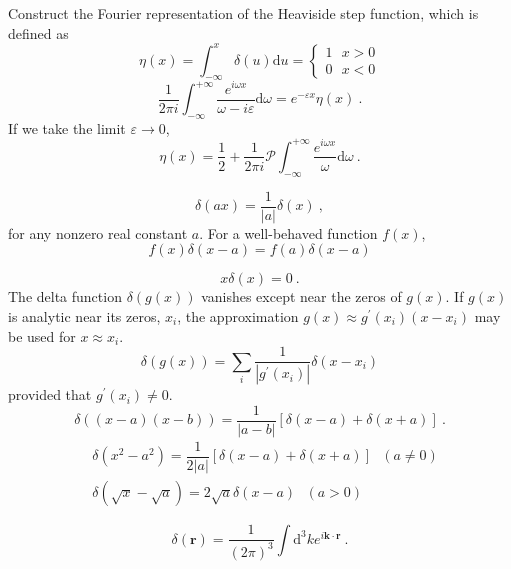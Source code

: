 \documentclass[12pt,a4paper]{article}
\renewcommand{\vec}[1]{\boldsymbol{#1}}
\newcommand{\dif}{\mathrm{d}}
\begin{document}
Construct the Fourier representation of the Heaviside step function, which is defined as
\begin{equation}
\eta(x) = \int_{-\infty}^x \delta(u) \dif u = 
\begin{cases}
1 ~~~ x > 0 \\
0 ~~~ x < 0
\end{cases}
\end{equation}
\begin{equation}
\dfrac{1}{2\pi i} \int_{-\infty}^{+\infty} \dfrac{e^{i\omega x}}{\omega -i \varepsilon} \dif \omega = e^{-\varepsilon x} \eta(x) ~.
\end{equation}
If we take the limit $\varepsilon \rightarrow 0$,
\begin{equation}
\eta(x) = \dfrac{1}{2} + \dfrac{1}{2\pi i} \mathcal P \int_{-\infty}^{+\infty} \dfrac{e^{i\omega x}}{\omega} \dif \omega ~. 
\end{equation}

\begin{equation}
\delta(ax) = \dfrac{1}{|a|} \delta(x) ~,
\end{equation}
for any nonzero real constant $a$. For a well-behaved function $f(x)$,
\begin{equation}
f(x) \delta(x-a) = f(a) \delta(x-a)
\end{equation}

\begin{equation}
x \delta(x) = 0 ~.
\end{equation}
The delta function $\delta(g(x))$ vanishes except near the zeros of $g(x)$. If $g(x)$ is analytic near its zeros, $x_i$, the approximation $g(x) \approx  g^\prime(x_i)(x - x_i)$ may be used for $x \approx x_i$. 
\begin{equation}
\delta(g(x)) = \sum_i \dfrac{1}{|g^\prime(x_i)|} \delta(x-x_i)
\end{equation}
provided that $g^\prime(x_i) \neq 0$.
\begin{equation}
\delta((x-a)(x-b)) = \dfrac{1}{|a-b|} [\delta(x-a) + \delta(x+a)] ~.
\end{equation}
\begin{align}
& \delta(x^2 -a^2) = \dfrac{1}{2|a|} [\delta(x-a) + \delta(x+a)] ~~~ (a \neq 0 ) \\
& \delta(\sqrt{x} - \sqrt{a}) = 2\sqrt{a} \delta(x-a) ~~~ (a > 0) ~
\end{align}



\begin{equation}
\delta(\vec{r}) = \dfrac{1}{(2\pi)^3} \int \dif^3 k e^{i\vec{k}\cdot \vec{r}} ~.
\end{equation}






\end{document}
